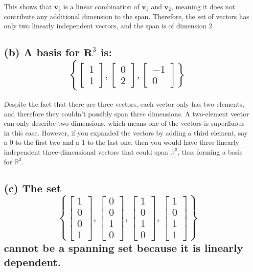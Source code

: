 \documentclass{article}
\begin{document}
This shows that $\mathbf{v}_3$ is a linear combination of $\mathbf{v}_1$ and $\mathbf{v}_2$, meaning it does not contribute any additional dimension to the span. Therefore, the set of vectors has only two linearly independent vectors, and the span is of dimension $2$.

\subsection*{(b) A basis for $\mathbf{R}^3$ is:
\[ \left\{ \begin{bmatrix} 1 \\ 1 \end{bmatrix}, \begin{bmatrix} 0 \\ 2 \end{bmatrix}, \begin{bmatrix} -1 \\ 0 \end{bmatrix} \right\} \]
}

Despite the fact that there are three vectors, each vector only has two elements, and therefore they couldn't possibly span three dimensions. A two-element vector can only describe two dimensions, which means one of the vectors is superfluous in this case. However, if you expanded the vectors by adding a third element, say a $0$ to the first two and a $1$ to the last one, then you would have three linearly independent three-dimensional vectors that could span $\mathbb{R}^3$, thus forming a basis for $\mathbb{R}^3$.

\subsection*{(c) The set
\[
\left\{ 
\begin{bmatrix} 1 \\ 0 \\ 0 \\ 1 \end{bmatrix}, 
\begin{bmatrix} 0 \\ 0 \\ 1 \\ 0 \end{bmatrix}, 
\begin{bmatrix} 1 \\ 0 \\ 1 \\ 0 \end{bmatrix}, 
\begin{bmatrix} 1 \\ 0 \\ 1 \\ 1 \end{bmatrix} 
\right\}
\]
cannot be a spanning set because it is linearly dependent.}
\end{document}
